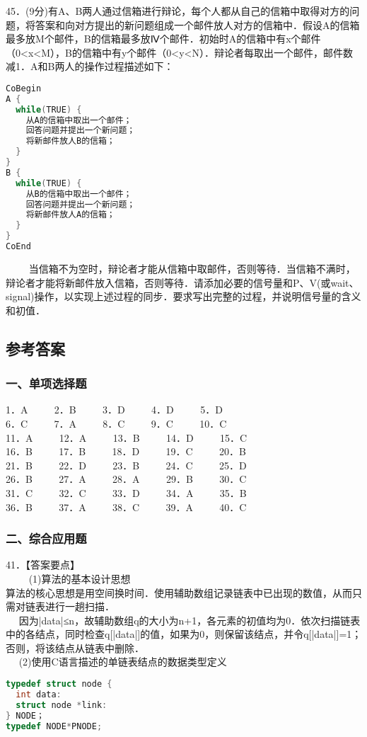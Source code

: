 45．(9分)有A、B两人通过信箱进行辩论，每个人都从自己的信箱中取得对方的问题，将答案和向对方提出的新问题组成一个邮件放人对方的信箱中．假设A的信箱最多放M个邮件，B的信箱最多放Ⅳ个邮件．初始时A的信箱中有x个邮件（0<x<M），B的信箱中有y个邮件（0<y<N）．辩论者每取出一个邮件，邮件数减1．A和B两人的操作过程描述如下： \\
\begin{lstlisting}[language=cpp]
CoBegin
A {
  while(TRUE) {
    从A的信箱中取出一个邮件；
    回答问题并提出一个新问题；
    将新邮件放人B的信箱；
  }
}
B {
  while(TRUE) {
    从B的信箱中取出一个邮件；
    回答问题并提出一个新问题；
    将新邮件放人A的信箱；
  }
}
CoEnd
\end{lstlisting}
$\qquad$ 当信箱不为空时，辩论者才能从信箱中取邮件，否则等待．当信箱不满时，辩论者才能将新邮件放入信箱，否则等待．请添加必要的信号量和P、V(或wait、signal)操作，以实现上述过程的同步．要求写出完整的过程，并说明信号量的含义和初值．


\subsection{参考答案}
\subsubsection{一、单项选择题}
1．A $\qquad$ 2．B $\qquad$ 3．D $\qquad$ 4．D $\qquad$ 5．D \\
6．C $\qquad$ 7．A $\qquad$ 8．C $\qquad$ 9．C $\qquad$ 10．C \\
11．A $\qquad$ 12．A $\qquad$ 13．B $\qquad$ 14．D $\qquad$ 15．C \\
16．B $\qquad$ 17．B $\qquad$ 18．D $\qquad$ 19．C $\qquad$ 20．B \\
21．B $\qquad$ 22．D $\qquad$ 23．B $\qquad$ 24．C $\qquad$ 25．D \\
26．B $\qquad$ 27．A $\qquad$ 28．A $\qquad$ 29．B $\qquad$ 30．C \\
31．C $\qquad$ 32．C $\qquad$ 33．D $\qquad$ 34．A $\qquad$ 35．B \\
36．B $\qquad$ 37．A $\qquad$ 38．C $\qquad$ 39．A $\qquad$ 40．C

\subsubsection{二、综合应用题}

41．【答案要点】 \\
$\qquad$ (1)算法的基本设计思想 \\
算法的核心思想是用空间换时间．使用辅助数组记录链表中已出现的数值，从而只需对链表进行一趟扫描． \\
$\quad$ 因为|data|≤n，故辅助数组q的大小为n+1，各元素的初值均为0．依次扫描链表中的各结点，同时检查q[|data|]的值，如果为0，则保留该结点，并令q[|data|]=1；否则，将该结点从链表中删除． \\
$\quad$ (2)使用C语言描述的单链表结点的数据类型定义 \\
\begin{lstlisting}[language=cpp]
typedef struct node {
  int data:
  struct node *link:
} NODE；
typedef NODE*PNODE;
\end{lstlisting}

